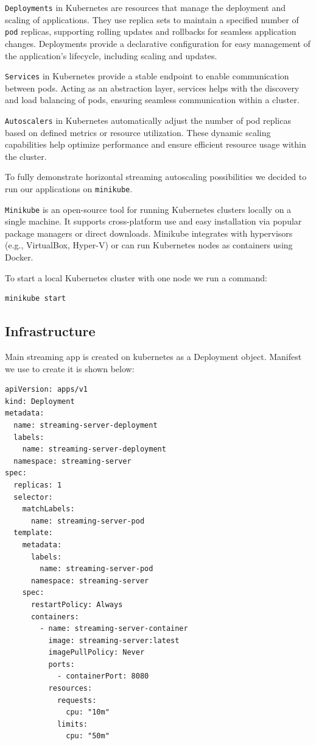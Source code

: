 \documentclass{article}
\begin{document}
\texttt{Deployments} in Kubernetes are resources that manage the
deployment and scaling of applications. They use replica sets to
maintain a specified number of \texttt{pod} replicas, supporting rolling
updates and rollbacks for seamless application changes. Deployments
provide a declarative configuration for easy management of the
application's lifecycle, including scaling and updates.

\texttt{Services} in Kubernetes provide a stable endpoint to enable
communication between pods. Acting as an abstraction layer, services
helps with the discovery and load balancing of pods, ensuring seamless
communication within a cluster.

\texttt{Autoscalers} in Kubernetes automatically adjust the number of
pod replicas based on defined metrics or resource utilization. These
dynamic scaling capabilities help optimize performance and ensure
efficient resource usage within the cluster.

To fully demonstrate horizontal streaming autoscaling possibilities we
decided to run our applications on \texttt{minikube}.

\texttt{Minikube} is an open-source tool for running Kubernetes clusters
locally on a single machine. It supports cross-platform use and easy
installation via popular package managers or direct downloads. Minikube
integrates with hypervisors (e.g., VirtualBox, Hyper-V) or can run
Kubernetes nodes as containers using Docker.

To start a local Kubernetes cluster with one node we run a command:

\begin{verbatim}
minikube start
\end{verbatim}

\subsection{Infrastructure}\label{infrastructure}

Main streaming app is created on kubernetes as a Deployment object.
Manifest we use to create it is shown below:

\begin{verbatim}
apiVersion: apps/v1
kind: Deployment
metadata:
  name: streaming-server-deployment
  labels:
    name: streaming-server-deployment
  namespace: streaming-server
spec:
  replicas: 1
  selector:
    matchLabels:
      name: streaming-server-pod
  template:
    metadata:
      labels:
        name: streaming-server-pod
      namespace: streaming-server
    spec:
      restartPolicy: Always
      containers:
        - name: streaming-server-container
          image: streaming-server:latest
          imagePullPolicy: Never
          ports:
            - containerPort: 8080
          resources:
            requests:
              cpu: "10m"
            limits:
              cpu: "50m"
\end{verbatim}
\end{document}

